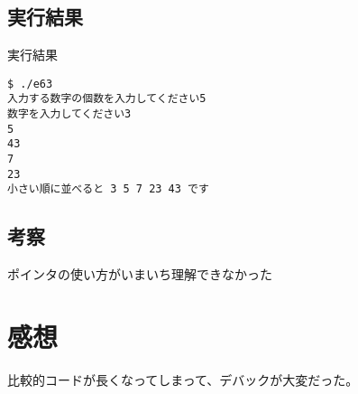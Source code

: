 \documentclass[a4j,titlepage]{jarticle}
\begin{document}
\subsection{実行結果}
\begin{itembox}[l]{実行結果}
\begin{verbatim}
$ ./e63
入力する数字の個数を入力してください5
数字を入力してください3
5
43
7
23
小さい順に並べると 3 5 7 23 43 です
\end{verbatim}
\end{itembox}

\subsection{考察}
ポインタの使い方がいまいち理解できなかった
\section{感想}
比較的コードが長くなってしまって、デバックが大変だった。
\end{document}
